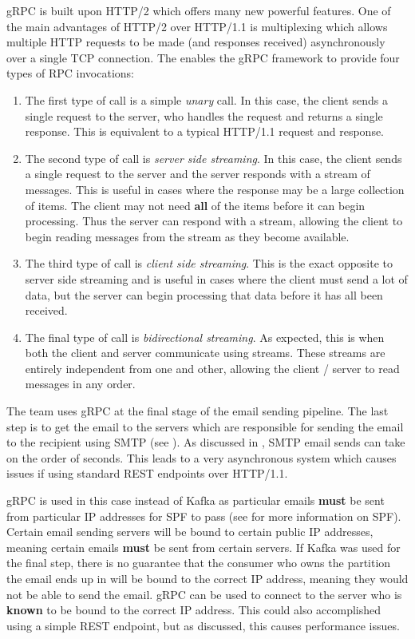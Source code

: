 gRPC is built upon HTTP/2 which offers many new powerful features. One of the main advantages of HTTP/2 over HTTP/1.1 is multiplexing which allows multiple HTTP requests to be made (and responses received) asynchronously over a single TCP connection. The enables the gRPC framework to provide four types of RPC invocations:

\begin{enumerate}
  \item{The first type of call is a simple \textit{unary} call. In this case, the client sends a single request to the server, who handles the request and returns a single response. This is equivalent to a typical HTTP/1.1 request and response.}
  \item{The second type of call is \textit{server side streaming}. In this case, the client sends a single request to the server and the server responds with a stream of messages. This is useful in cases where the response may be a large collection of items. The client may not need \textbf{all} of the items before it can begin processing. Thus the server can respond with a stream, allowing the client to begin reading messages from the stream as they become available.}
  \item{The third type of call is \textit{client side streaming}. This is the exact opposite to server side streaming and is useful in cases where the client must send a lot of data, but the server can begin processing that data before it has all been received.}
  \item{The final type of call is \textit{bidirectional streaming}. As expected, this is when both the client and server communicate using streams. These streams are entirely independent from one and other, allowing the client / server to read messages in any order.}
\end{enumerate}

The \team{} team uses gRPC at the final stage of the email sending pipeline. The last step is to get the email to the servers which are responsible for sending the email to the recipient using SMTP (see ). As discussed in , SMTP email sends can take on the order of seconds. This leads to a very asynchronous system which causes issues if using standard REST endpoints over HTTP/1.1. 

gRPC is used in this case instead of Kafka as particular emails \textbf{must} be sent from particular IP addresses for SPF to pass (see  for more information on SPF). Certain email sending servers will be bound to certain public IP addresses, meaning certain emails \textbf{must} be sent from certain servers. If Kafka was used for the final step, there is no guarantee that the consumer who owns the partition the email ends up in will be bound to the correct IP address, meaning they would not be able to send the email. gRPC can be used to connect to the server who is \textbf{known} to be bound to the correct IP address. This could also accomplished using a simple REST endpoint, but as discussed, this causes performance issues.

